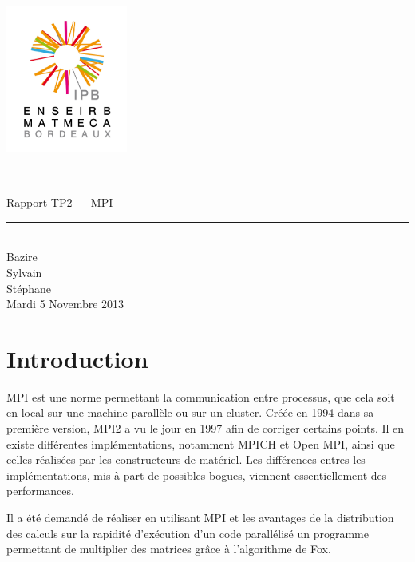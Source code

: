 \documentclass[a4paper,11pt]{article}
\begin{document}
\begin{titlepage}
  \begin{center}

    \begin{center}
      \includegraphics[width=4cm]{EM.jpg}
    \end{center}

    \vspace*{1cm}
        
    \rule{0.75\linewidth}{0.7mm}\\[0.4cm]
    {\Huge Rapport TP2 --- MPI\\[0.4cm]}
    \rule{0.75\linewidth}{0.7mm} \\[1.5cm]

    {\Large Bazire \\Sylvain {}\\Stéphane \\[2cm]}
    {\Large Mardi 5 Novembre 2013}
  \end{center}
\end{titlepage}

\tableofcontents
\clearpage
\section{Introduction}
MPI est une norme permettant la communication entre processus, que cela soit en local sur une machine parallèle ou sur un cluster. Créée en 1994 dans sa première version, MPI2 a vu le jour en 1997 afin de corriger certains points. Il en existe différentes implémentations, notamment MPICH et Open MPI, ainsi que celles réalisées par les constructeurs de matériel. Les différences entres les implémentations, mis à part de possibles bogues, viennent essentiellement des performances.

Il a été demandé de réaliser en utilisant MPI et les avantages de la distribution des calculs sur la rapidité d'exécution d'un code parallélisé un programme permettant de multiplier des matrices grâce à l'algorithme de Fox.
\end{document}
